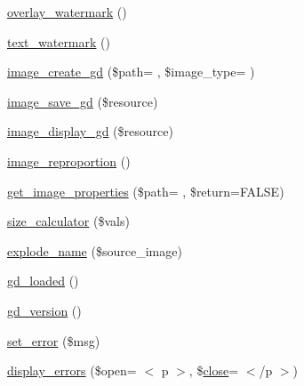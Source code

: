 \begin{DoxyCompactItemize}
\item 
\hyperlink{class_c_i___image__lib_a7fa0fd0aabe26803d61d7e09c1cb73de}{overlay\+\_\+watermark} ()
\item 
\hyperlink{class_c_i___image__lib_afb7640b6150e16b00efac0511d9fa03d}{text\+\_\+watermark} ()
\item 
\hyperlink{class_c_i___image__lib_a9de08e24f6573c9d80ccf38f95c33d1f}{image\+\_\+create\+\_\+gd} (\$path= \textquotesingle{}\textquotesingle{}, \$image\+\_\+type= \textquotesingle{}\textquotesingle{})
\item 
\hyperlink{class_c_i___image__lib_a802a33d51249d4d31d59cbc89fbc4dd5}{image\+\_\+save\+\_\+gd} (\$resource)
\item 
\hyperlink{class_c_i___image__lib_af641d1806701b178dfba3dbf7da54462}{image\+\_\+display\+\_\+gd} (\$resource)
\item 
\hyperlink{class_c_i___image__lib_a55ee590fb313c50e99d6c1d4cd9618d2}{image\+\_\+reproportion} ()
\item 
\hyperlink{class_c_i___image__lib_a77ab93f41bdc26b9220b69a91644d854}{get\+\_\+image\+\_\+properties} (\$path= \textquotesingle{}\textquotesingle{}, \$return=F\+A\+L\+S\+E)
\item 
\hyperlink{class_c_i___image__lib_a827549db4de2281a8f2b35ada2ef3909}{size\+\_\+calculator} (\$vals)
\item 
\hyperlink{class_c_i___image__lib_a32661288e0bea18ea50fbb7be6535af5}{explode\+\_\+name} (\$source\+\_\+image)
\item 
\hyperlink{class_c_i___image__lib_a04376d5530f38a1a61f59c2d769284ba}{gd\+\_\+loaded} ()
\item 
\hyperlink{class_c_i___image__lib_a7d141f85d677d5e6db12020009569fde}{gd\+\_\+version} ()
\item 
\hyperlink{class_c_i___image__lib_a892f1ba7cba3731a3fc68f1f64e92610}{set\+\_\+error} (\$msg)
\item 
\hyperlink{class_c_i___image__lib_a3ed4aa1a4d480c82bb1b663efd466aee}{display\+\_\+errors} (\$open= \textquotesingle{}$<$ p $>$\textquotesingle{}, \$\hyperlink{bootstrap_8min_8js_afaca3a961d693f40135a872e93e71198}{close}= \textquotesingle{}$<$/p $>$\textquotesingle{})
\end{DoxyCompactItemize}
